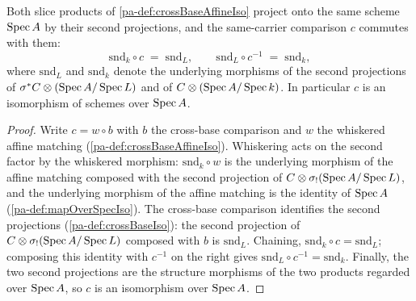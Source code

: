 \begin{lemma}
  \label{pa-lem:crossBaseAffineIso_snd}
  \leanok

  Both slice products of \ref{pa-def:crossBaseAffineIso} project onto the same scheme
  \(\operatorname{Spec} A\) by their second projections, and the same-carrier comparison \(c\)
  commutes with them:
  \[
    \mathrm{snd}_{k} \circ c \;=\; \mathrm{snd}_{L},
    \qquad
    \mathrm{snd}_{L} \circ c^{-1} \;=\; \mathrm{snd}_{k},
  \]
  where \(\mathrm{snd}_{L}\) and \(\mathrm{snd}_{k}\) denote the underlying morphisms of
  the second projections of \(\sigma^{*}C \otimes (\operatorname{Spec} A/\operatorname{Spec} L)\) and of
  \(C \otimes (\operatorname{Spec} A/\operatorname{Spec} k)\). In particular \(c\) is an isomorphism of schemes over
  \(\operatorname{Spec} A\).
\end{lemma}
\begin{proof}
  \leanok
  Write \(c = w \circ b\) with \(b\) the cross-base comparison and \(w\) the whiskered
  affine matching (\ref{pa-def:crossBaseAffineIso}). Whiskering acts on the second factor
  by the whiskered morphism: \(\mathrm{snd}_{k} \circ w\) is the underlying morphism of
  the affine matching composed with the second projection of
  \(C \otimes \sigma_{!}(\operatorname{Spec} A/\operatorname{Spec} L)\), and the underlying morphism of the affine
  matching is the identity of \(\operatorname{Spec} A\) (\ref{pa-def:mapOverSpecIso}). The cross-base
  comparison identifies the second projections (\ref{pa-def:crossBaseIso}): the second
  projection of \(C \otimes \sigma_{!}(\operatorname{Spec} A/\operatorname{Spec} L)\) composed with \(b\) is
  \(\mathrm{snd}_{L}\). Chaining, \(\mathrm{snd}_{k} \circ c = \mathrm{snd}_{L}\);
  composing this identity with \(c^{-1}\) on the right gives
  \(\mathrm{snd}_{L} \circ c^{-1} = \mathrm{snd}_{k}\). Finally, the two second
  projections are the structure morphisms of the two products regarded over
  \(\operatorname{Spec} A\), so \(c\) is an isomorphism over \(\operatorname{Spec} A\).
\end{proof}

